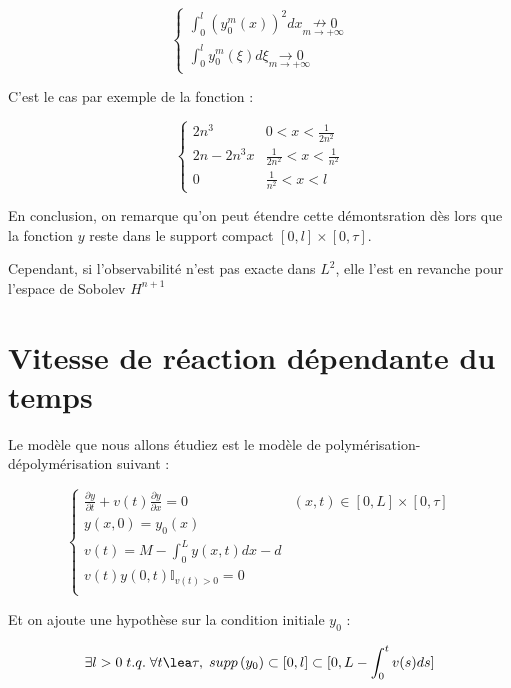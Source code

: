 \documentclass[a4paper]{article}
\theoremstyle{definition}
\theoremstyle{remark}
\newcommand{\dep}{d}
\begin{document}
\[
\begin{cases}
	\int_0^l (y_0^m(x))^2 dx \underset{m\to+\infty}{\nrightarrow 0} \\
	\int_0^l y_0^m(\xi)d\xi \underset{m\to+\infty}{\rightarrow 0}
\end{cases}
\]

C'est le cas par exemple de la fonction :

\[
\begin{cases}
	2n^3 & 0 <x < \frac{1}{2n^2}\\
	2n - 2n^3x & \frac{1}{2n^2} <x<\frac{1}{n^2}\\
	0 & \frac{1}{n^2} <x<l
\end{cases}
\]


En conclusion, on remarque qu'on peut étendre cette démontsration dès lors que la fonction $y$ reste dans le support compact $[0,l] \times [0,\tau]$.

Cependant, si l'observabilité n'est pas exacte dans $L^2$, elle l'est en revanche pour l'espace de Sobolev $H^{n+1}$
		
\section{Vitesse de réaction dépendante du temps}

Le modèle que nous allons étudiez est le modèle de polymérisation-dépolymérisation suivant :

\begin{equation}
		\label{eq:poldepol}
		\begin{cases}
			\displaystyle \frac{\partial y}{\partial t}+ v(t) \frac{\partial y} {\partial x}  = 0 & (x,t) \in [0,L] \times [0, \tau] \\
             y(x,0) = y_{0} (x) \\
			 v(t) = M - \int_0^L y(x,t)dx - \dep \\
			 v(t)y(0,t)\mathbb{I}_{v(t) > 0} = 0 \\
		\end{cases}
\end{equation}

Et on ajoute une hypothèse sur la condition initiale $y_0$ :

\begin{equation}
	\label{hyp:compact}
	\exists l>0 \; t.q. \; \forall t \lea \tau, \; supp \, (y_{0}) \subset [0,l]\subset [0,L-\int_{0}^t v(s)ds]
\end{equation}
\end{document}
